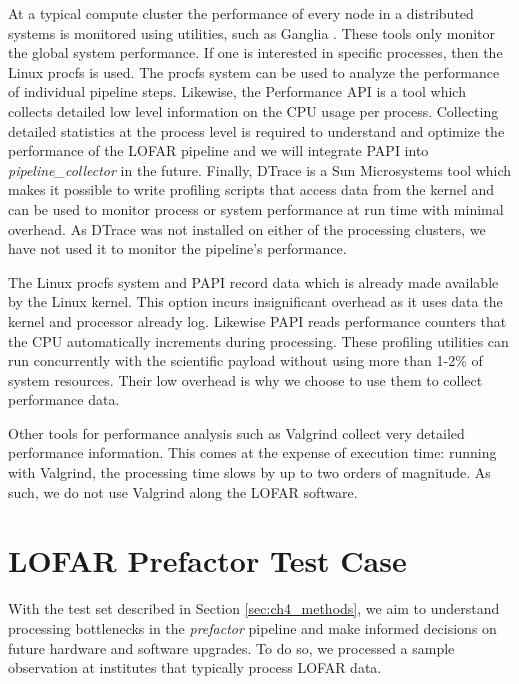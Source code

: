 At a typical compute cluster the performance of every node in a distributed systems is monitored using utilities, such as Ganglia \citep{ganglia}. These tools only monitor the global system performance. 
If one is interested in specific processes, then the Linux procfs \citep{procfs} is used. The procfs system can be used to analyze the performance of individual pipeline steps. Likewise, the Performance API \citep[PAPI,][]{papi} is a tool which collects detailed low level information on the CPU usage per process. Collecting detailed statistics at the process level is required to understand and optimize the performance of the LOFAR pipeline and we will integrate PAPI into \textit{pipeline\_collector} in the future. Finally, DTrace\citep{dtrace} is a Sun Microsystems tool which makes it possible to write profiling scripts that access data from the kernel and can be used to monitor process or system performance at run time with minimal overhead. As DTrace was not installed on either of the processing clusters, we have not used it to monitor the pipeline's performance. 

The Linux procfs system and PAPI record data which is already made available by the Linux kernel. This option incurs insignificant overhead as it uses data the kernel and processor already log. Likewise PAPI reads performance counters that the CPU automatically increments during processing. These profiling utilities can run concurrently with the scientific payload without using more than 1-2\% of system resources. Their low overhead is why we choose to use them to collect performance data. 

Other tools for performance analysis such as Valgrind \citep{valgrind} collect very detailed performance information. This comes at the expense of execution time: running with Valgrind, the processing time slows by up to two orders of magnitude. As such, we do not use Valgrind along the LOFAR software. 



\section{LOFAR Prefactor Test Case}\label{sec:ch4_results}
  
With the test set described in Section \ref{sec:ch4_methods}, we aim to understand processing bottlenecks in the \textit{prefactor} pipeline and make informed decisions on future hardware and software upgrades. To do so, we processed a sample observation at institutes that typically process LOFAR data. 

